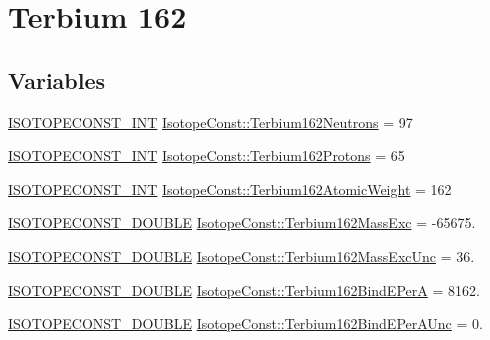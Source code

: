 \hypertarget{group___isotope_const-_terbium-_tb162}{}\section{Terbium 162}
\label{group___isotope_const-_terbium-_tb162}
\subsection*{Variables}
\begin{DoxyCompactItemize}
\item 
\mbox{\hyperlink{group___isotope_const-_macros_ga5f18360b3e99483a35c32d789e62621c}{I\+S\+O\+T\+O\+P\+E\+C\+O\+N\+S\+T\+\_\+\+I\+NT}} \mbox{\hyperlink{group___isotope_const-_terbium-_tb162_gaa49aa0ff765c8b1cabda4f3fae212071}{Isotope\+Const\+::\+Terbium162\+Neutrons}} = 97
\item 
\mbox{\hyperlink{group___isotope_const-_macros_ga5f18360b3e99483a35c32d789e62621c}{I\+S\+O\+T\+O\+P\+E\+C\+O\+N\+S\+T\+\_\+\+I\+NT}} \mbox{\hyperlink{group___isotope_const-_terbium-_tb162_ga85809b39ba8297f95635fea62501fca6}{Isotope\+Const\+::\+Terbium162\+Protons}} = 65
\item 
\mbox{\hyperlink{group___isotope_const-_macros_ga5f18360b3e99483a35c32d789e62621c}{I\+S\+O\+T\+O\+P\+E\+C\+O\+N\+S\+T\+\_\+\+I\+NT}} \mbox{\hyperlink{group___isotope_const-_terbium-_tb162_ga966843c5ee19860da246c96a485b816e}{Isotope\+Const\+::\+Terbium162\+Atomic\+Weight}} = 162
\item 
\mbox{\hyperlink{group___isotope_const-_macros_ga8f45a7272ce02c0b4c65c44636ed719a}{I\+S\+O\+T\+O\+P\+E\+C\+O\+N\+S\+T\+\_\+\+D\+O\+U\+B\+LE}} \mbox{\hyperlink{group___isotope_const-_terbium-_tb162_gad6b545a93fc5ac5f5871294eb4b78ad8}{Isotope\+Const\+::\+Terbium162\+Mass\+Exc}} = -\/65675.
\item 
\mbox{\hyperlink{group___isotope_const-_macros_ga8f45a7272ce02c0b4c65c44636ed719a}{I\+S\+O\+T\+O\+P\+E\+C\+O\+N\+S\+T\+\_\+\+D\+O\+U\+B\+LE}} \mbox{\hyperlink{group___isotope_const-_terbium-_tb162_ga8d68ec9b95017b82d02250c342c8461d}{Isotope\+Const\+::\+Terbium162\+Mass\+Exc\+Unc}} = 36.
\item 
\mbox{\hyperlink{group___isotope_const-_macros_ga8f45a7272ce02c0b4c65c44636ed719a}{I\+S\+O\+T\+O\+P\+E\+C\+O\+N\+S\+T\+\_\+\+D\+O\+U\+B\+LE}} \mbox{\hyperlink{group___isotope_const-_terbium-_tb162_ga92ab952779c6d1ac498ed8551115b4c4}{Isotope\+Const\+::\+Terbium162\+Bind\+E\+PerA}} = 8162.
\item 
\mbox{\hyperlink{group___isotope_const-_macros_ga8f45a7272ce02c0b4c65c44636ed719a}{I\+S\+O\+T\+O\+P\+E\+C\+O\+N\+S\+T\+\_\+\+D\+O\+U\+B\+LE}} \mbox{\hyperlink{group___isotope_const-_terbium-_tb162_ga998c7e278fd6aa9c3ecc4f615f64c316}{Isotope\+Const\+::\+Terbium162\+Bind\+E\+Per\+A\+Unc}} = 0.

\end{DoxyCompactItemize}
